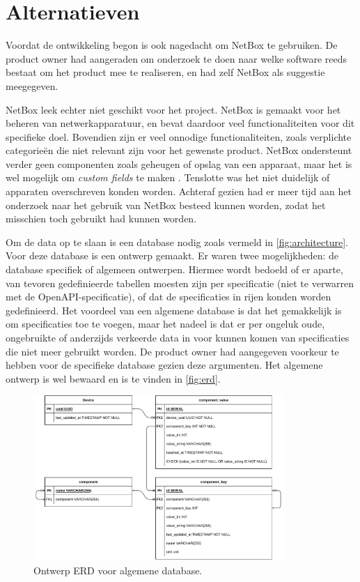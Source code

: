 \documentclass[../report.tex]{subfiles}
\begin{document}
\section{Alternatieven}
\label{sec:alternatieven}

Voordat de ontwikkeling begon is ook nagedacht om NetBox te gebruiken. De \gls*{product owner} had aangeraden om onderzoek te doen naar welke software reeds bestaat om het product mee te realiseren, en had zelf NetBox als suggestie meegegeven.

NetBox leek echter niet geschikt voor het project. NetBox is gemaakt voor het beheren van netwerkapparatuur, en bevat daardoor veel functionaliteiten voor dit specifieke doel. Bovendien zijn er veel onnodige functionaliteiten, zoals verplichte categorieën die niet relevant zijn voor het gewenste product. NetBox ondersteunt verder geen componenten zoals geheugen of opslag van een apparaat, maar het is wel mogelijk om \textit{custom fields} te maken \parencite{netbox_custom_fields}. Tenslotte was het niet duidelijk of apparaten overschreven konden worden. Achteraf gezien had er meer tijd aan het onderzoek naar het gebruik van NetBox besteed kunnen worden, zodat het misschien toch gebruikt had kunnen worden.

Om de data op te slaan is een database nodig zoals vermeld in \autoref{fig:architecture}. Voor deze database is een ontwerp gemaakt. Er waren twee mogelijkheden: de database specifiek of algemeen ontwerpen. Hiermee wordt bedoeld of er aparte, van tevoren gedefinieerde tabellen moesten zijn per specificatie (niet te verwarren met de \gls*{OpenAPI-specificatie}), of dat de specificaties in rijen konden worden gedefinieerd. Het voordeel van een algemene database is dat het gemakkelijk is om specificaties toe te voegen, maar het nadeel is dat er per ongeluk oude, ongebruikte of anderzijds verkeerde data in voor kunnen komen van specificaties die niet meer gebruikt worden. De \gls*{product owner} had aangegeven voorkeur te hebben voor de specifieke database gezien deze argumenten. Het algemene ontwerp is wel bewaard en is te vinden in \autoref{fig:erd}.

\begin{figure}
  \centering
  \includegraphics[width=0.85\textwidth]{../assets/images/drawio/erd.pdf}
  \caption{Ontwerp \gls*{ERD} voor algemene database.}
  \label{fig:erd}
\end{figure}
\end{document}
